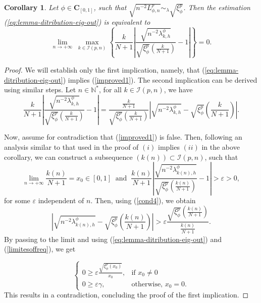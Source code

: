 \documentclass[11pt]{article}
\newtheorem{corollary}{Corollary}[section]
\begin{document}
\begin{corollary}\label{improvedfrequincyestimation}
    Let $\phi\in\mathbf{C}_{[0,1]}$, such that  $\sqrt{n^{-2}L_{\phi,n}^p}\sim_{\lambda} \sqrt{\xi^p_{\phi}}$. Then the estimation (\ref{eq:lemma-ditribution-eig-out}) is equivalent to 
    \begin{equation}\label{improved1}
        \lim_{n \rightarrow +\infty}\;\max_{k \in \mathcal{I}(p,n)} \left\{\frac{k}{N+1}\left|\frac{\sqrt{n^{-2}\lambda^{\phi}_{k,h}}}{\sqrt{\xi^p_{\phi}}\left(\frac{k}{N+1}\right)}-1 \right|\right\}=0.
    \end{equation}
\end{corollary}
\begin{proof}
    We will establish only the first implication, namely, that (\ref{eq:lemma-ditribution-eig-out}) implies (\ref{improved1}). The second implication can be derived using similar steps. Let $n\in\mathbb{N}^{\ast}$, for all $k\in \mathcal{I}(p,n)$, we have 
    \begin{equation}\label{cond4}
        \frac{k}{N+1}\left|\frac{\sqrt{n^{-2}\lambda^{\phi}_{k,h}}}{\sqrt{\xi^p_{\phi}}\left(\frac{k}{N+1}\right)}-1 \right|=\frac{\frac{k}{N+1}}{\sqrt{\xi^p_{\phi}}\left(\frac{k}{N+1}\right)}\left| \sqrt{n^{-2}\lambda^{\phi}_{k,h}}-\sqrt{\xi^p_{\phi}}\left(\frac{k}{N+1}\right)\right|.
    \end{equation}

Now, assume for contradiction that (\ref{improved1}) is false. Then, following an analysis similar to that used in the proof of $(i)$ implies $(ii)$ in the above  corollary, we can construct a subsequence  $(k(n))\subset  \mathcal{I}(p,n)$, such that 
$$\lim_{n \rightarrow +\infty}\frac{k(n)}{N+1}=x_0\in[0,1]\;\;\text{and}\;\;\frac{k(n)}{N+1}\left|\frac{\sqrt{n^{-2}\lambda^{\phi}_{k(n),h}}}{\sqrt{\xi^p_{\phi}}\left(\frac{k(n)}{N+1}\right)}-1 \right|>\varepsilon>0,$$
for some $\varepsilon$  independent of $n$. Then, using  (\ref{cond4}), we obtain
$$\left| \sqrt{n^{-2}\lambda^{\phi}_{k(n),h}}-\sqrt{\xi^p_{\phi}}\left(\frac{k(n)}{N+1}\right)\right|>\varepsilon\frac{\sqrt{\xi^p_{\phi}}\left(\frac{k(n)}{N+1}\right)}{\frac{k(n)}{N+1}}.$$
By passing to the limit and using (\ref{eq:lemma-ditribution-eig-out}) and (\ref{limitesoffreq}), we get

$$
\left\{
\begin{array}{ll}
0\geq \varepsilon\frac{\sqrt{\xi^p_{\phi}(x_0)}}{x_0},& \text{if } x_0\neq 0\\
0\geq\varepsilon \gamma,& \text{otherwise, } x_0=0.
\end{array}
\right.
$$
 This results in a contradiction, concluding the proof of the first implication.


\end{proof}
\end{document}
